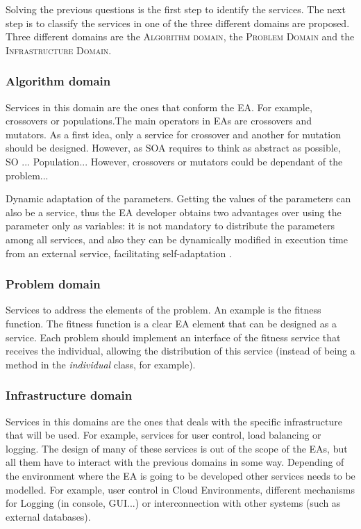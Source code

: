 Solving the previous questions is the first step to identify the services. The next step is to classify the services in one of the three different domains are proposed. Three different domains are the \textsc{Algorithm domain}, the \textsc{Problem Domain} and the \textsc{Infrastructure Domain}. 

\subsubsection{Algorithm domain} Services in this domain are the ones that conform the EA. For example, crossovers or populations.The main operators in EAs are crossovers and mutators. As a first idea, only a service for crossover and another for mutation should be designed. However, as SOA requires to think as abstract as possible, SO ... Population... However, crossovers or mutators could be dependant of the problem...

Dynamic adaptation of the parameters. Getting the values of the parameters can also be a
  service, %
 thus the EA developer obtains two advantages over using the parameter only as variables: %
it is not mandatory to distribute the parameters among all services,
 and also they can be dynamically modified in execution time from an external service, facilitating self-adaptation \cite{eiben2005shared}.

\subsubsection{Problem domain} Services to address the elements of the problem. An example is the fitness function. The fitness function is a clear EA element that can be designed as a service. Each problem should implement an interface
  of the fitness service that receives the individual, allowing the
  distribution of this service (instead of being a method in the {\em
    individual} class, for example).

\subsubsection{Infrastructure domain} Services in this domains are the ones that deals with the specific infrastructure that will be used. For example, services for user control, load balancing or logging. The design of many of these services is out of the scope of the EAs, but all them have to interact with the previous domains in some way. Depending of the environment where the EA is going to be developed other services needs to be modelled. For example, user control in Cloud Environments, different mechanisms for Logging (in console, GUI...) or interconnection with other systems (such as external databases).

